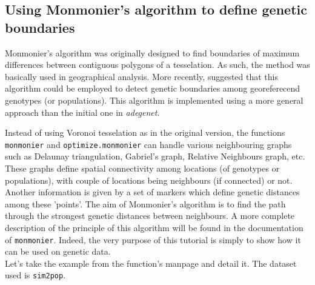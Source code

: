 \documentclass{article}
\begin{document}
\subsection{Using Monmonier's algorithm to define genetic boundaries}
Monmonier's algorithm \cite{tj433} was originally designed to find boundaries of maximum differences between contiguous polygons of a tesselation.
As such, the method was basically used in geographical analysis.
More recently, \cite{np120} suggested that this algorithm could be employed to detect genetic boundaries among georeferecend genotypes (or populations).
This algorithm is implemented using a more general approach than the initial one in \textit{adegenet}.

Instead of using Voronoi tesselation as in the original version, the functions \texttt{monmonier} and \texttt{optimize.monmonier} can handle various neighbouring graphs such as Delaunay triangulation, Gabriel's graph, Relative Neighbours graph, etc.
These graphs define spatial connectivity among locations (of genotypes or populations), with couple of locations being neighbours (if connected) or not.
Another information is given by a set of markers which define genetic distances among these 'points'.
The aim of Monmonier's algorithm is to find the path through the strongest genetic distances between neighbours.
A more complete description of the principle of this algorithm will be found in the documentation of \texttt{monmonier}.
Indeed, the very purpose of this tutorial is simply to show how it can be used on genetic data.
\\

Let's take the example from the function's manpage and detail it.
The dataset used is \texttt{sim2pop}.
\end{document}

